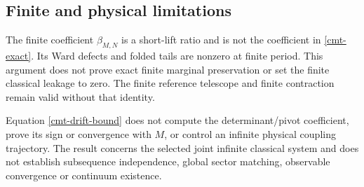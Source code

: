 \subsection{Finite and physical limitations}
\label{cmt-scope}

The finite coefficient \(\beta_{M,N}\) is a short-lift
ratio and is not the coefficient in
\eqref{cmt-exact}. Its Ward defects and folded tails
are nonzero at finite period. This argument does not
prove exact finite marginal preservation or set the
finite classical leakage to zero. The finite reference
telescope and finite contraction remain valid without
that identity.

Equation \eqref{cmt-drift-bound} does not compute the
determinant/pivot coefficient, prove its sign or convergence
with \(M\), or control an infinite physical coupling
trajectory. The result concerns the selected joint
infinite classical system and does not establish
subsequence independence, global sector matching,
observable convergence or continuum existence.
